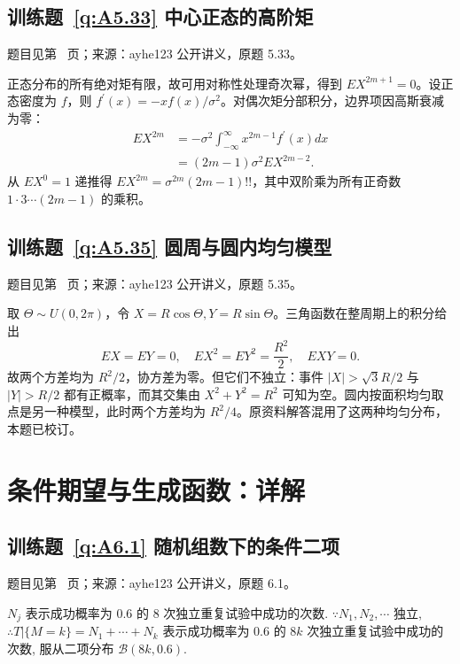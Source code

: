 \documentclass[UTF8,12pt,a4paper,fontset=fandol]{ctexbook}
\begin{document}
\subsection*{训练题~\ref{q:A5.33} 中心正态的高阶矩}\label{a:A5.33}{\small 题目见第~\pageref{q:A5.33} 页；来源：ayhe123 公开讲义，原题 5.33。}
\begin{solve}正态分布的所有绝对矩有限，故可用对称性处理奇次幂，得到 $EX^{2m+1}=0$。设正态密度为 $f$，则 $f^{\prime}(x)=-xf(x)/\sigma^2$。对偶次矩分部积分，边界项因高斯衰减为零：\[\begin{aligned}EX^{2m}&=-\sigma^2\int_{-\infty}^{\infty}x^{2m-1}f^{\prime}(x)dx\\&=(2m-1)\sigma^2EX^{2m-2}.\end{aligned}\]从 $EX^0=1$ 递推得 $EX^{2m}=\sigma^{2m}(2m-1)!!$，其中双阶乘为所有正奇数 $1\cdot3\cdots(2m-1)$ 的乘积。\end{solve}

\subsection*{训练题~\ref{q:A5.35} 圆周与圆内均匀模型}\label{a:A5.35}{\small 题目见第~\pageref{q:A5.35} 页；来源：ayhe123 公开讲义，原题 5.35。}
\begin{solve}取 $\Theta\sim U(0,2\pi)$，令 $X=R\cos\Theta,Y=R\sin\Theta$。三角函数在整周期上的积分给出\[EX=EY=0,\quad EX^2=EY^2=\frac{R^2}{2},\quad EXY=0.\]故两个方差均为 $R^2/2$，协方差为零。但它们不独立：事件 $|X|>\sqrt3R/2$ 与 $|Y|>R/2$ 都有正概率，而其交集由 $X^2+Y^2=R^2$ 可知为空。圆内按面积均匀取点是另一种模型，此时两个方差均为 $R^2/4$。原资料解答混用了这两种均匀分布，本题已校订。\end{solve}

\clearpage\section*{条件期望与生成函数：详解}

\subsection*{训练题~\ref{q:A6.1} 随机组数下的条件二项}\label{a:A6.1}{\small 题目见第~\pageref{q:A6.1} 页；来源：ayhe123 公开讲义，原题 6.1。}
\begin{solve}
    $N_j$ 表示成功概率为 $0.6$ 的 $8$ 次独立重复试验中成功的次数. $\because N_1,N_2,\cdots$ 独立, $\therefore T|\{M=k\}=N_1+\cdots+N_k$ 表示成功概率为 $0.6$ 的 $8k$ 次独立重复试验中成功的次数, 服从二项分布 $\mathcal{B}(8k,0.6)$.
\end{solve}
\end{document}
